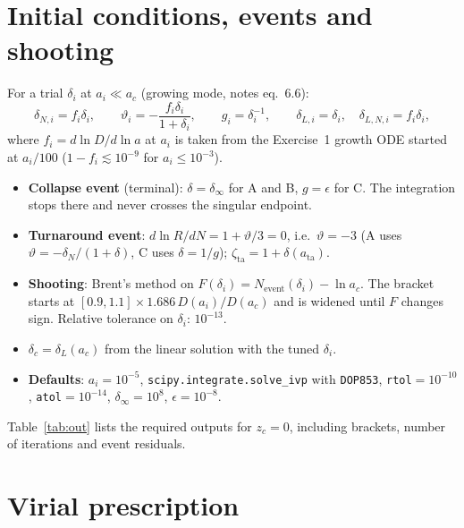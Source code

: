 \documentclass[11pt,a4paper]{article}
\newcommand{\res}{../results/exercise_4}
\begin{document}
\section{Initial conditions, events and shooting}

For a trial $\delta_i$ at $a_i \ll a_c$ (growing mode, notes eq.~6.6):
\begin{equation}
  \delta_{N,i} = f_i\delta_i,\qquad \vartheta_i = -\frac{f_i\delta_i}{1+\delta_i},\qquad g_i = \delta_i^{-1},\qquad
  \delta_{L,i} = \delta_i,\quad \delta_{L,N,i} = f_i\delta_i,
\end{equation}
where $f_i = d\ln D/d\ln a$ at $a_i$ is taken from the Exercise~1 growth ODE started at $a_i/100$ ($1-f_i \lesssim 10^{-9}$ for $a_i\le10^{-3}$).

\begin{itemize}
  \item \textbf{Collapse event} (terminal): $\delta=\delta_\infty$ for A and B, $g=\epsilon$ for C. The integration stops there and never crosses the singular endpoint.
  \item \textbf{Turnaround event}: $d\ln R/dN = 1+\vartheta/3 = 0$, i.e.\ $\vartheta=-3$ (A uses $\vartheta=-\delta_N/(1+\delta)$, C uses $\delta = 1/g$); $\zeta_\mathrm{ta} = 1+\delta(a_\mathrm{ta})$.
  \item \textbf{Shooting}: Brent's method on $F(\delta_i) = N_\mathrm{event}(\delta_i) - \ln a_c$. The bracket starts at $[0.9,1.1]\times 1.686\,D(a_i)/D(a_c)$ and is widened until $F$ changes sign. Relative tolerance on $\delta_i$: $10^{-13}$.
  \item $\delta_c = \delta_L(a_c)$ from the linear solution with the tuned $\delta_i$.
  \item \textbf{Defaults}: $a_i = 10^{-5}$, \texttt{scipy.integrate.solve\_ivp} with \texttt{DOP853}, \texttt{rtol}$=10^{-10}$, \texttt{atol}$=10^{-14}$, $\delta_\infty = 10^8$, $\epsilon=10^{-8}$.
\end{itemize}
Table~\ref{tab:out} lists the required outputs for $z_c=0$, including brackets, number of iterations and event residuals.

\begin{table}[h]
  \centering
  \caption{Required outputs for $z_c=0$ (default settings). $\ln(a_\mathrm{ev}/a_c)$ is the event residual.}
  \label{tab:out}
  \resizebox{\linewidth}{!}{}
\end{table}

\section{Virial prescription}
\end{document}
